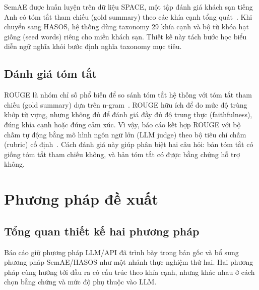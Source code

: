 \documentclass[12pt,a4paper]{report}
\begin{document}
SemAE được huấn luyện trên dữ liệu SPACE, một tập đánh giá khách sạn tiếng Anh có tóm tắt tham chiếu (gold summary) theo các khía cạnh tổng quát~\cite{angelidis2021extractive}. Khi chuyển sang HASOS, hệ thống dùng taxonomy 29 khía cạnh và bộ từ khóa hạt giống (seed words) riêng cho miền khách sạn. Thiết kế này tách bước học biểu diễn ngữ nghĩa khỏi bước định nghĩa taxonomy mục tiêu.

\section{Đánh giá tóm tắt}

ROUGE là nhóm chỉ số phổ biến để so sánh tóm tắt hệ thống với tóm tắt tham chiếu (gold summary) dựa trên n-gram~\cite{lin2004rouge}. ROUGE hữu ích để đo mức độ trùng khớp từ vựng, nhưng không đủ để đánh giá đầy đủ độ trung thực (faithfulness), đúng khía cạnh hoặc đúng cảm xúc. Vì vậy, báo cáo kết hợp ROUGE với bộ chấm tự động bằng mô hình ngôn ngữ lớn (LLM judge) theo bộ tiêu chí chấm (rubric) cố định~\cite{liu2023geval,zheng2023judging}. Cách đánh giá này giúp phân biệt hai câu hỏi: bản tóm tắt có giống tóm tắt tham chiếu không, và bản tóm tắt có được bằng chứng hỗ trợ không.

\chapter{Phương pháp đề xuất}

\section{Tổng quan thiết kế hai phương pháp}

Báo cáo giữ phương pháp LLM/API đã trình bày trong bản gốc và bổ sung phương pháp SemAE/HASOS như một nhánh thực nghiệm thứ hai. Hai phương pháp cùng hướng tới đầu ra có cấu trúc theo khía cạnh, nhưng khác nhau ở cách chọn bằng chứng và mức độ phụ thuộc vào LLM.
\end{document}
